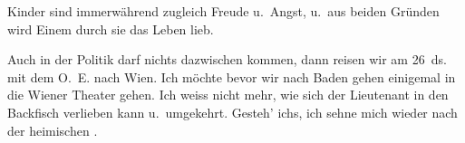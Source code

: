 \pstart
           Kinder sind immerwährend zugleich Freude u. Angst, u. aus beiden Gründen wird Einem durch
          sie das Leben lieb.\pend
           
\pstart
           Auch in der Politik darf nichts dazwischen kommen, dann reisen wir am 26 ds.
          mit dem O. E. nach Wien. Ich möchte bevor wir nach Baden gehen
          einigemal in die Wiener Theater gehen. Ich weiss nicht
          mehr, wie sich der Lieutenant in den Backfisch verlieben kann u. umgekehrt. Gesteh’ ichs,
          ich sehne mich wieder nach der heimischen \label{K_L03830-2v}\label{K_L03830-2}.\pend
           
